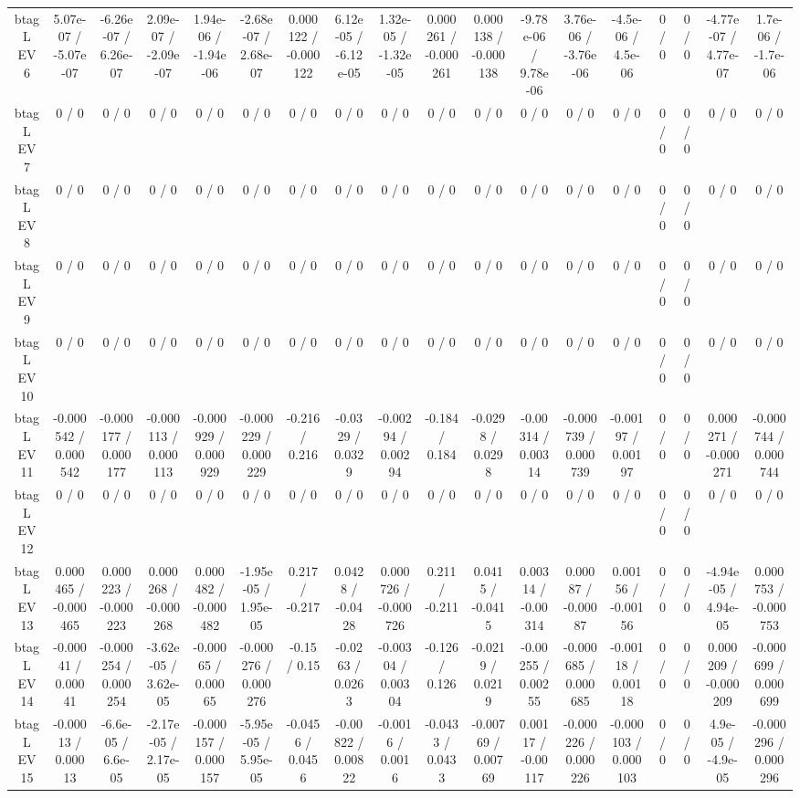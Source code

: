 \documentclass[10pt]{article}
\begin{document}
\begin{table}[htbp]
\begin{center}
\begin{tabular}{|c|c|c|c|c|c|c|c|c|c|c|c|c|c|c|c|c|c|}
  btag L EV 6 & 5.07e-07 / -5.07e-07 & -6.26e-07 / 6.26e-07 & 2.09e-07 / -2.09e-07 & 1.94e-06 / -1.94e-06 & -2.68e-07 / 2.68e-07 & 0.000122 / -0.000122 & 6.12e-05 / -6.12e-05 & 1.32e-05 / -1.32e-05 & 0.000261 / -0.000261 & 0.000138 / -0.000138 & -9.78e-06 / 9.78e-06 & 3.76e-06 / -3.76e-06 & -4.5e-06 / 4.5e-06 & 0 / 0 & 0 / 0 & -4.77e-07 / 4.77e-07 & 1.7e-06 / -1.7e-06 \\ 
  btag L EV 7 & 0 / 0 & 0 / 0 & 0 / 0 & 0 / 0 & 0 / 0 & 0 / 0 & 0 / 0 & 0 / 0 & 0 / 0 & 0 / 0 & 0 / 0 & 0 / 0 & 0 / 0 & 0 / 0 & 0 / 0 & 0 / 0 & 0 / 0 \\ 
  btag L EV 8 & 0 / 0 & 0 / 0 & 0 / 0 & 0 / 0 & 0 / 0 & 0 / 0 & 0 / 0 & 0 / 0 & 0 / 0 & 0 / 0 & 0 / 0 & 0 / 0 & 0 / 0 & 0 / 0 & 0 / 0 & 0 / 0 & 0 / 0 \\ 
  btag L EV 9 & 0 / 0 & 0 / 0 & 0 / 0 & 0 / 0 & 0 / 0 & 0 / 0 & 0 / 0 & 0 / 0 & 0 / 0 & 0 / 0 & 0 / 0 & 0 / 0 & 0 / 0 & 0 / 0 & 0 / 0 & 0 / 0 & 0 / 0 \\ 
  btag L EV 10 & 0 / 0 & 0 / 0 & 0 / 0 & 0 / 0 & 0 / 0 & 0 / 0 & 0 / 0 & 0 / 0 & 0 / 0 & 0 / 0 & 0 / 0 & 0 / 0 & 0 / 0 & 0 / 0 & 0 / 0 & 0 / 0 & 0 / 0 \\ 
  btag L EV 11 & -0.000542 / 0.000542 & -0.000177 / 0.000177 & -0.000113 / 0.000113 & -0.000929 / 0.000929 & -0.000229 / 0.000229 & -0.216 / 0.216 & -0.0329 / 0.0329 & -0.00294 / 0.00294 & -0.184 / 0.184 & -0.0298 / 0.0298 & -0.00314 / 0.00314 & -0.000739 / 0.000739 & -0.00197 / 0.00197 & 0 / 0 & 0 / 0 & 0.000271 / -0.000271 & -0.000744 / 0.000744 \\ 
  btag L EV 12 & 0 / 0 & 0 / 0 & 0 / 0 & 0 / 0 & 0 / 0 & 0 / 0 & 0 / 0 & 0 / 0 & 0 / 0 & 0 / 0 & 0 / 0 & 0 / 0 & 0 / 0 & 0 / 0 & 0 / 0 & 0 / 0 & 0 / 0 \\ 
  btag L EV 13 & 0.000465 / -0.000465 & 0.000223 / -0.000223 & 0.000268 / -0.000268 & 0.000482 / -0.000482 & -1.95e-05 / 1.95e-05 & 0.217 / -0.217 & 0.0428 / -0.0428 & 0.000726 / -0.000726 & 0.211 / -0.211 & 0.0415 / -0.0415 & 0.00314 / -0.00314 & 0.00087 / -0.00087 & 0.00156 / -0.00156 & 0 / 0 & 0 / 0 & -4.94e-05 / 4.94e-05 & 0.000753 / -0.000753 \\ 
  btag L EV 14 & -0.00041 / 0.00041 & -0.000254 / 0.000254 & -3.62e-05 / 3.62e-05 & -0.00065 / 0.00065 & -0.000276 / 0.000276 & -0.15 / 0.15 & -0.0263 / 0.0263 & -0.00304 / 0.00304 & -0.126 / 0.126 & -0.0219 / 0.0219 & -0.00255 / 0.00255 & -0.000685 / 0.000685 & -0.00118 / 0.00118 & 0 / 0 & 0 / 0 & 0.000209 / -0.000209 & -0.000699 / 0.000699 \\ 
  btag L EV 15 & -0.00013 / 0.00013 & -6.6e-05 / 6.6e-05 & -2.17e-05 / 2.17e-05 & -0.000157 / 0.000157 & -5.95e-05 / 5.95e-05 & -0.0456 / 0.0456 & -0.00822 / 0.00822 & -0.0016 / 0.0016 & -0.0433 / 0.0433 & -0.00769 / 0.00769 & 0.00117 / -0.00117 & -0.000226 / 0.000226 & -0.000103 / 0.000103 & 0 / 0 & 0 / 0 & 4.9e-05 / -4.9e-05 & -0.000296 / 0.000296 \\ 

\end{tabular}
\end{center}
\end{table}
\end{document}
